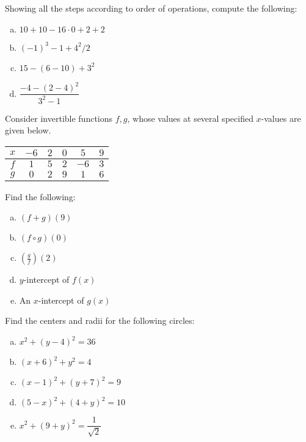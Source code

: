 \documentclass[11pt,letterpaper]{article}
\begin{document}
\prob Showing all the steps according to order of operations, compute the following:
	\begin{enumerate}[(a)]
	\item $10 + 10 - 16 \cdot 0 + 2 + 2$
	\item $(-1)^3 - 1 + 4^2/2$
	\item $15 - (6 - 10) + 3^2$
	\item $\dfrac{-4 - (2 - 4)^2}{3^2 - 1}$
	\end{enumerate} \pspace


\prob Consider invertible functions $f, g$, whose values at several specified $x$-values are given below. 
	\begin{table}[h]
	\centering
	\begin{tabular}{|c||c|c|c|c|c|} \hline
	$x$ & $-6$ & $2$ & $0$ & $5$ & $9$ \\ \hline
	$f$ & $1$ & $5$ & $2$ & $-6$ & $3$ \\ \hline
	$g$ & $0$ & $2$ & $9$ & $1$ & $6$ \\ \hline
	\end{tabular}
	\end{table}
Find the following:
	\begin{enumerate}[(a)]
	\item $(f + g)(9)$
	\item $(f \circ g)(0)$
	\item $\left( \frac{g}{f} \right)(2)$
	\item $y$-intercept of $f(x)$
	\item An $x$-intercept of $g(x)$
	\end{enumerate} \pspace


\prob Find the centers and radii for the following circles:
	\begin{enumerate}[(a)]
	\item $x^2 + (y - 4)^2= 36$
	\item $(x + 6)^2 + y^2= 4$
	\item $(x - 1)^2 + (y + 7)^2= 9$
	\item $(5 - x)^2 + (4 + y)^2= 10$
	\item $x^2 + (9 + y)^2= \dfrac{1}{\sqrt{2}}$
	\end{enumerate} \pspace
\end{document}
